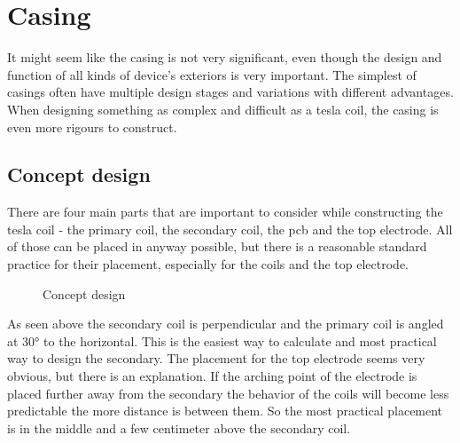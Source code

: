 \chapter{Casing}


It might seem like the casing is not very significant, even though the design and function of all kinds of device's exteriors is very important. The simplest of casings often have multiple design stages and variations with different advantages. When designing something as complex and difficult as a tesla coil, the casing is even more rigours to construct. 


\section{Concept design}
\label{sec:concept-design}

There are four main parts that are important to consider while constructing the tesla coil - the primary coil, the secondary coil, the \gls{pcb} and the top electrode. All of those can be placed in anyway possible, but there is a reasonable standard practice for their placement, especially for the coils and the top electrode. 

\begin{figure}
    \centering
    \caption{Concept design}
    \label{BD-envision}
\end{figure}

As seen above the secondary coil is perpendicular and the primary coil is angled at 30° to the horizontal. This is the easiest way to calculate and most practical way to design the secondary. The placement for the top electrode seems very obvious, but there is an explanation. If the arching point of the electrode is placed further away from the secondary the behavior of the coils will become less predictable the more distance is between them. So the most practical placement is in the middle and a few centimeter above the secondary coil.

